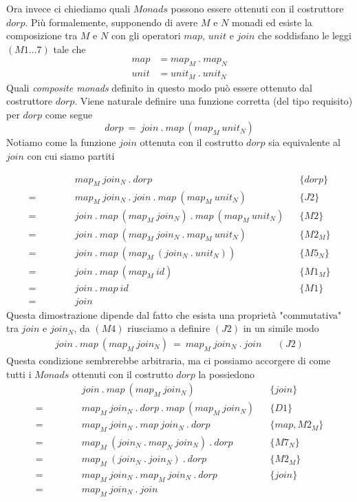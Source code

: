 Ora invece ci chiediamo quali $Monads$ possono essere ottenuti con il costruttore
$dorp$.
Più formalemente, supponendo di avere $M$ e $N$ monadi ed esiste la composizione
tra $M$ e $N$ con gli operatori $map$, $unit$ e $join$ che soddisfano le leggi
$(M1\dots7)$ tale che
\begin{align*}
  map &= map_M\ .\ map_N\\
  unit &= unit_M\ .\ unit_N
\end{align*}
Quali \textit{composite monads} definito in questo modo può essere ottenuto dal
costruttore $dorp$.
Viene naturale definire una funzione corretta (del tipo requisito) per $dorp$ come
segue
\begin{equation*}
  dorp\ =\ join\ .\ map\ (map_M\ unit_N)
\end{equation*}
Notiamo come la funzione $join$ ottenuta con il costrutto $dorp$ sia equivalente
al $join$ con cui siamo partiti
\begin{framed}
  \label{dorp_join}
  \begin{align*}
    \quad\qquad
    &\quad map_M\ join_N\ .\ dorp && \{dorp\}\\
    =&\quad map_M\ join_N\ .\ join\ .\ map\ (map_M\ unit_N) && \{J2\}\\
    =&\quad join\ .\ map\ (map_M\ join_N)\ .\ map\ (map_M\ unit_N) && \{M2\}\\
    =&\quad join\ .\ map\ (map_M\ join_N\ .\ map_M\ unit_N) && \{M2_M\}\\
    =&\quad join\ .\ map\ (map_M\ (join_N\ .\ unit_N)) && \{M5_N\}\\
    =&\quad join\ .\ map\ (map_M\ id) && \{M1_M\}\\
    =&\quad join\ .\ map\ id && \{M1\}\\
    =&\quad join
  \end{align*}
  Questa dimostrazione dipende dal fatto che esista una proprietà "commutativa"
  tra $join$ e $join_N$, da $(M4)$ riusciamo a definire $(J2)$ in un simile modo
  \begin{align*}
    join\ .\ map\ (map_M\ join_N)\ =\ map_M\ join_N\ .\ join &&(J2)
  \end{align*}
  Questa condizione sembrerebbe arbitraria, ma ci possiamo accorgere di come
  tutti i $Monads$ ottenuti con il costrutto $dorp$ la possiedono
  \begin{align*}
    \quad\qquad
    &\quad join\ .\ map\ (map_M\ join_N) && \{join\}\\
    =&\quad map_M\ join_N\ .\ dorp\ .\ map\ (map_M\ join_N) && \{D1\}\\
    =&\quad map_M\ join_N\ .\ map\ join_N\ .\ dorp && \{map, M2_M\}\\
    =&\quad map_M\ (join_N\ .\ map_N\ join_N)\ .\ dorp && \{M7_N\}\\
    =&\quad map_M\ (join_N\ .\ join_N)\ .\ dorp && \{M2_M\}\\
    =&\quad map_M\ join_N\ .\ map_M\ join_N\ .\ dorp && \{join\}\\
    =&\quad map_M\ join_N\ .\ join
  \end{align*}
\end{framed}
